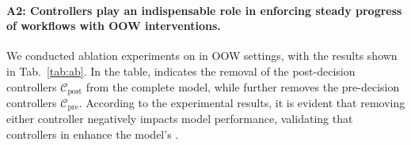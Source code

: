 \paragraph{A2: Controllers play an indispensable role in enforcing steady progress of workflows with OOW interventions.}
We conducted ablation experiments on \model in OOW settings, with the results shown in Tab.~\ref{tab:ab}. 
In the table,  indicates the removal of the post-decision controllers $\mathcal{C}_{\text{post}}$ from the complete model, while  further removes the pre-decision controllers $\mathcal{C}_{\text{pre}}$. 
According to the experimental results, it is evident that removing either controller negatively impacts model performance, validating that controllers in \model enhance the model's \ofollow.
